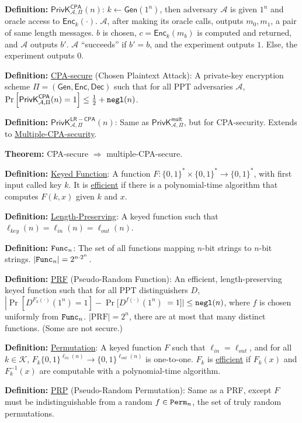 \documentclass[10pt]{article}
\newcommand{\AAA}{\mathcal{A}}
\newcommand{\KKK}{\mathcal{K}}
\newcommand{\defn}[1]{{\bf Definition:} \underline{#1}}
\newcommand{\thm}[1]{{\bf Theorem:} \underline{#1}}
\newcommand{\Enc}{\mathsf{Enc}}
\newcommand{\Dec}{\mathsf{Dec}}
\newcommand{\Gen}{\mathsf{Gen}}
\newcommand{\GenEncDec}{(\Gen,\Enc,\Dec)}
\newcommand{\ExptMultArgs}[2]{\mathsf{PrivK}^{\mathsf{mult}}_{#1,#2}}
\newcommand{\ExptCpaArgs}[2]{\mathsf{PrivK}^{\mathsf{CPA}}_{#1,#2}}
\newcommand{\ExptLrCpa}{\mathsf{PrivK}^{\mathsf{LR-CPA}}_{\AAA,\Pi}}
\newcommand{\ExptMult}{\ExptMultArgs{\AAA}{\Pi}}
\newcommand{\ExptCpa}{\ExptCpaArgs{\AAA}{\Pi}}
\newcommand{\negl}{{\tt negl}}
\newcommand{\from}{\leftarrow}
\begin{document}
\begin{multicols}{5}

\defn{$\ExptCpa(n)$}: $k\from\Gen(1^n)$, then adversary $\AAA$ is given $1^n$ and oracle access to $\Enc_k(\cdot)$. $\AAA$, after making its oracle calls, outputs $m_0,m_1$, a pair of same length messages. $b$ is chosen, $c=\Enc_k(m_b)$ is computed and returned, and $\AAA$ outputs $b'$. $\AAA$ ``succeeds'' if $b'=b$, and the experiment outputs $1$. Else, the experiment outputs $0$.

\defn{CPA-secure} (Chosen Plaintext Attack): A private-key encryption scheme $\Pi=\GenEncDec$ such that for all PPT adversaries $\AAA$, $\Pr\left[\ExptCpa(n)=1\right]\leq\frac{1}{2}+\negl(n)$.

\defn{$\ExptLrCpa(n)$}: Same as $\ExptMult$, but for CPA-security. Extends to \underline{Multiple-CPA-security}.

\thm{}CPA-secure $\Rightarrow$ multiple-CPA-secure.

\defn{Keyed Function}: A function $F:\{0,1\}^*\times\{0,1\}^*\to\{0,1\}^*$, with first input called key $k$. It is \underline{efficient} if there is a polynomial-time algorithm that computes $F(k,x)$ given $k$ and $x$.

\defn{Length-Preserving}: A keyed function such that $\ell_{key}(n)=\ell_{in}(n)=\ell_{out}(n)$.

\defn{${\tt Func}_n$}: The set of all functions mapping $n$-bit strings to $n$-bit strings. $|{\tt Func}_n|=2^{n\cdot2^n}$.

\defn{PRF} (Pseudo-Random Function): An efficient, length-preserving keyed function such that for all PPT distinguishers $D$, $\left|\Pr[D^{F_k(\cdot)}(1^n)=1]-\Pr[D^{f(\cdot)}(1^n)\right.$ $\left.=1]\right|\leq\negl(n)$, where $f$ is chosen uniformly from ${\tt Func}_n$. $|\text{PRF}|=2^n$, there are at most that many distinct functions. (Some are not secure.)

\defn{Permutation}: A keyed function $F$ such that $\ell_{in}=\ell_{out}$, and for all $k\in\KKK$, $F_k\{0,1\}^{\ell_{in}(n)}\to\{0,1\}^{\ell_{out}(n)}$ is one-to-one. $F_k$ is \underline{efficient} if $F_k(x)$ and $F_k^{-1}(x)$ are computable with a polynomial-time algorithm.

\defn{PRP} (Pseudo-Random Permutation): Same as a PRF, except $F$ must be indistinguishable from a random $f\in{\tt Perm}_n$, the set of truly random permutations.


\end{multicols}
\end{document}
